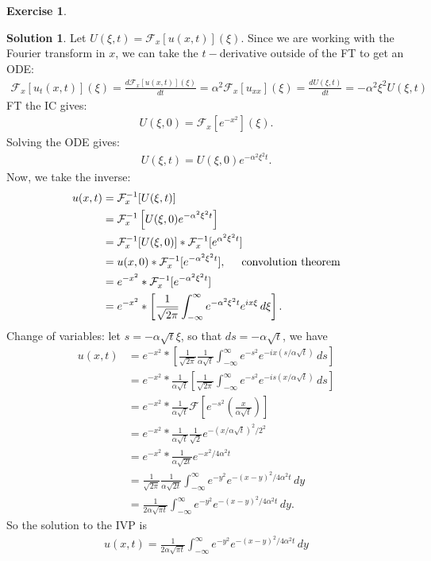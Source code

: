 \documentclass{article}
\theoremstyle{definition}
\newtheorem*{exer*}{Exercise}
\newtheorem*{sln*}{Solution}
\newcommand{\F}{\mathcal{F}}
\newcommand{\f}[2]{\frac{#1}{#2}}
\newcommand{\lp}{\left(}
\newcommand{\rp}{\right)}
\newcommand{\lb}{\left[}
\newcommand{\rb}{\right]}
\begin{document}
\begin{exer*}
\begin{sln*}
		Let $U(\xi, t) = \F_x[u(x,t)](\xi)$. Since we are working with the Fourier transform in $x$, we can take the $t-$derivative outside of the FT to get an ODE:
		\begin{align*}
		\F_x[u_t(x,t)](\xi) = \f{d\F_x[u(x,t)](\xi)}{dt} = \alpha^2 \F_x[u_{xx}](\xi) =\boxed{\f{dU(\xi,t)}{dt} = -\alpha^2 \xi^2 U(\xi, t)}
		\end{align*}
		FT the IC gives:
		\begin{align*}
		U(\xi, 0) = \F_x\lb e^{-x^2} \rb(\xi).
		\end{align*}
		Solving the ODE gives:
		\begin{align*}
		U(\xi, t) = U(\xi, 0)e^{-\alpha^2 \xi^2 t}.
		\end{align*}
		Now, we take the inverse:
		\begin{align*}
		u(x,t) &= \F_x^{-1}[U(\xi,t)] \\
		&= \F_x^{-1}\lb U(\xi, 0)e^{-\alpha^2 \xi^2 t}\rb \\
		&= \F_x^{-1}[U(\xi,0)] \ast \F^{-1}_x[e^{\alpha^2 \xi^2 t}]\\
		&= u(x,0) \ast \F^{-1}_x[e^{-\alpha^2 \xi^2 t}], \hspace{0.5cm} \text{convolution theorem}\\
		&= e^{-x^2} \ast \F^{-1}_x[e^{-\alpha^2 \xi^2 t}]\\
		&= e^{-x^2} \ast \lb \f{1}{\sqrt{2\pi}}  \int^\infty_{-\infty} e^{-\alpha^2 \xi^2 t}e^{ix\xi}\,d\xi \rb.
		\end{align*}
		Change of variables: let $s = -\alpha \sqrt{t} \xi$, so that $ds = -\alpha \sqrt{t}$, we have
		\begin{align*}
		u(x,t) &= e^{-x^2} \ast \lb \f{1}{\sqrt{2\pi}}  \f{1}{\alpha\sqrt{t}} \int^\infty_{-\infty} e^{-s^2}e^{-ix(s/\alpha\sqrt{t})}\,ds \rb\\
		&= e^{-x^2}\ast \f{1}{\alpha\sqrt{t}}\lb \f{1}{\sqrt{2\pi}}\int^\infty_{-\infty}e^{-s^2}e^{-is(x/\alpha\sqrt{t})}\,ds   \rb\\
		&= e^{-x^2} \ast \f{1}{\alpha\sqrt{t}} \F[e^{-s^2}\lp \f{x}{\alpha \sqrt{t}} \rp] \\
		&= e^{-x^2} \ast \f{1}{\alpha\sqrt{t}} \f{1}{\sqrt{2}}e^{-(x/\alpha \sqrt{t})^2 / 2^2}\\
		&= e^{-x^2} \ast \f{1}{\alpha\sqrt{2t}}e^{-x^2/4\alpha^2 t}\\
		&= \f{1}{\sqrt{2\pi}}\f{1}{\alpha\sqrt{2t}}\int^\infty_{-\infty} e^{-y^2}e^{-(x-y)^2/4\alpha^2 t}\,dy\\
		&= \f{1}{2\alpha\sqrt{\pi t}} \int^\infty_{-\infty} e^{-y^2}e^{-(x-y)^2/4\alpha^2 t}\,dy.
		\end{align*}
		So the solution to the IVP is
		\begin{align*}
		\boxed{u(x,t) = \f{1}{2\alpha\sqrt{\pi t}} \int^\infty_{-\infty} e^{-y^2}e^{-(x-y)^2/4\alpha^2 t}\,dy}
		\end{align*}
		
		
		
	\end{sln*}
\end{exer*}
\end{document}
